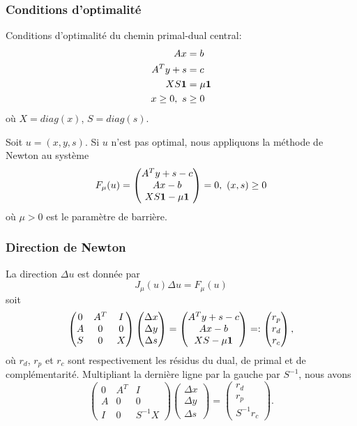 \documentclass[usepdftitle=false, aspectratio=169]{beamer}
\begin{document}
\begin{frame}
\frametitle{Conditions d'optimalité}

Conditions d'optimalité du chemin primal-dual central:
\begin{align*}
Ax &= b \\
A^Ty + s &= c \\
XS{\boldsymbol{1}} &= \mu{\boldsymbol{1}} \\
x \geq 0,\ s & \geq 0
\end{align*}
où $X = diag(x)$, $S= diag(s)$.

\mbox{}

Soit $u = (x, y, s)$. Si $u$ n'est pas optimal, nous appliquons la méthode de Newton au système
$$
F_{\mu}(u) = \begin{pmatrix}
	A^Ty+s-c  \\
	Ax-b  \\
	XS{\boldsymbol{1}} - \mu{\boldsymbol{1}} 
\end{pmatrix} = 0, \ (x,s) \geq 0
$$
où $\mu > 0$ est le paramètre de barrière.

\end{frame}

\begin{frame}
\frametitle{Direction de Newton}

La direction $\Delta u$ est donnée par
$$
J_{\mu}(u)\Delta u = F_{\mu}(u)
$$
soit
$$
\begin{pmatrix}
	0 & A^T & I  \\
	A & 0 & 0\\
	S & 0 & X
\end{pmatrix}
\begin{pmatrix}
	\Delta x  \\
	\Delta y \\
	\Delta s
\end{pmatrix} = \begin{pmatrix}
	A^Ty+s-c  \\
	Ax-b  \\
	XS-\mu {\boldsymbol{1}}
\end{pmatrix}
=:
\begin{pmatrix}
	r_p  \\
	r_d \\
	r_c
\end{pmatrix},
$$
où $r_d$, $r_p$ et $r_c$ sont respectivement les résidus du dual, de primal et de complémentarité.
Multipliant la dernière ligne par la gauche par $S^{-1}$, nous avons
$$
\begin{pmatrix}
	0 & A^T & I  \\
	A & 0 & 0\\
	I & 0 & S^{-1}X
\end{pmatrix}
\begin{pmatrix}
	\Delta x  \\
	\Delta y \\
	\Delta s
\end{pmatrix} = \begin{pmatrix}
	r_d  \\
	r_p  \\
	S^{-1}r_c 
\end{pmatrix}.
$$

\end{frame}
\end{document}
